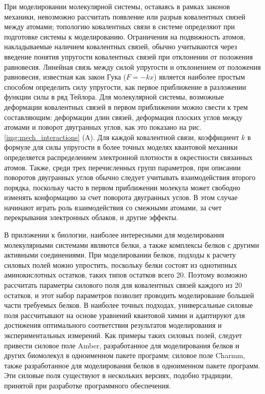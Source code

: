 При моделировании молекулярной системы, оставаясь в рамках законов механики, невозможно рассчитать появление или разрыв ковалентных связей между атомами; топологию ковалентных связи в системе определяют при подготовке системы к моделированию. Ограничения на подвижность атомов, накладываемые наличием ковалентных связей, обычно учитываются через введение понятия упругости ковалентных связей при отклонении от положения равновесия. Линейная связь между силой упругости и отклонением от положения равновесия, известная как закон Гука ($F = - k x$) является наиболее простым способом определить силу упругости, как первое приближение в разложении функции силы в ряд Тейлора. Для молекулярной системы, возможные деформации ковалентных связей в первом приближении можно свести к трем составляющим: деформации длин связей, деформация плоских углов между атомами и поворот двугранных углов, как это показано на рис. \ref{img:mech_interactions} (A). Для каждой ковалентной связи, коэффициент $k$ в формуле для силы упругости в более точных моделях квантовой механики определяется распределением электронной плотности в окрестности связанных атомов. Также, среди трех перечисленных групп параметров, при описании поворотов двугранных углов обычно следует учитывать взаимодействия второго порядка, поскольку часто в первом приближении молекула может свободно изменять конформацию за счет поворота двугранных углов. В этом случае начинают играть роль взаимодействия со смежными атомами, за счет перекрывания электронных облаков, и другие эффекты.

В приложении к биологии, наиболее интересными для моделирования молекулярными системами являются белки, а также комплексы белков с другими активными соединениями. При моделировании белков, подходы к расчету силовых полей можно упростить, поскольку белки состоят из однотипных аминокислотных остатков, таких типов остатков всего 20. Поэтому возможно рассчитать параметры силового поля для ковалентных связей каждого из 20 остатков, и этот набор параметров позволит проводить моделирование большей части требуемых белков. В наиболее точных подходах, универсальные силовые поля рассчитывают на основе уравнений квантовой химии и адаптируют для достижения оптимального соответствия результатов моделирования и экспериментальных измерений. Как примеры таких силовых полей, следует привести силовое поле Amber, разработанное для моделирования белков и других биомолекул в одноименном пакете программ; силовое поле Charmm, также разработанное для моделирования белков в одноименном пакете программ. Эти силовые поля существуют в нескольких версиях, подобно традиции, принятой при разработке программного обеспечения.


